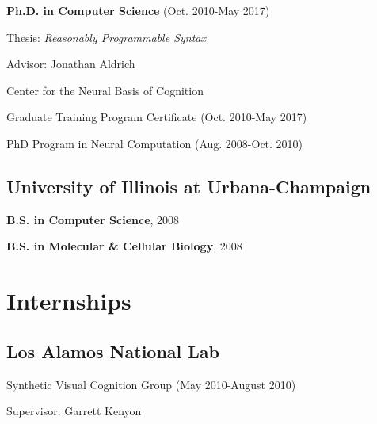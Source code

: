 \documentclass[10pt,letterpaper]{article}
\renewenvironment{itemize}{
  \begin{list}{}{
    \setlength{\leftmargin}{1.25em}
    \setlength{\itemsep}{0.25em}
    \setlength{\parskip}{0pt}
    \setlength{\parsep}{0.2em}
  }
}{
  \end{list}
}
\begin{document}
\begin{itemize}
  \item \textbf{Ph.D. in Computer Science} (Oct. 2010-May 2017)
        \begin{itemize}
          \item Thesis: \emph{Reasonably Programmable Syntax}
          \item Advisor: Jonathan Aldrich
        \end{itemize}
  \item Center for the Neural Basis of Cognition
        \begin{itemize}
          \item Graduate Training Program Certificate (Oct. 2010-May 2017)
          \item PhD Program in Neural Computation (Aug. 2008-Oct. 2010)
        \end{itemize}
\end{itemize}

\subsection*{University of Illinois at Urbana-Champaign}
\begin{itemize}
  \item \textbf{B.S. in Computer Science}, 2008
  \item \textbf{B.S. in Molecular \& Cellular Biology}, 2008
\end{itemize}


\section*{Internships}
\subsection*{Los Alamos National Lab}
\begin{itemize}
  \item Synthetic Visual Cognition Group (May 2010-August 2010)
  \item Supervisor: Garrett Kenyon
\end{itemize}
\end{document}
